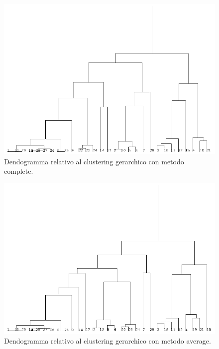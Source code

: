 \documentclass[12pt]{article}
\begin{document}
\begin{figure}[H]
	\includegraphics[width=\textwidth]{img/c-gerarchico-voti-complete.png}
	\caption{Dendogramma relativo al clustering gerarchico con metodo complete.}
	\label{fig:dendo-complete2}
\end{figure}
\begin{figure}[H]
	\includegraphics[width=\textwidth]{img/c-gerarchico-voti-average.png}
	\caption{Dendogramma relativo al clustering gerarchico con metodo average.}
	\label{fig:dendo-average2}
\end{figure}
\end{document}
